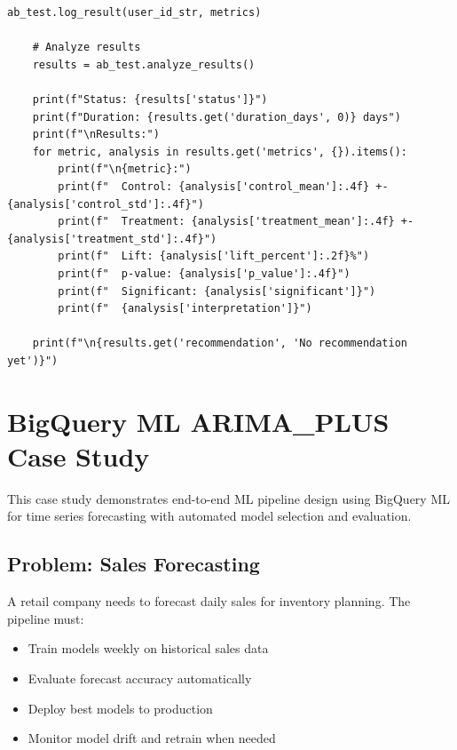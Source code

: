 \begin{lstlisting}[style=python, caption=Production A/B testing framework for ML models]
        ab_test.log_result(user_id_str, metrics)

    # Analyze results
    results = ab_test.analyze_results()

    print(f"Status: {results['status']}")
    print(f"Duration: {results.get('duration_days', 0)} days")
    print(f"\nResults:")
    for metric, analysis in results.get('metrics', {}).items():
        print(f"\n{metric}:")
        print(f"  Control: {analysis['control_mean']:.4f} +- {analysis['control_std']:.4f}")
        print(f"  Treatment: {analysis['treatment_mean']:.4f} +- {analysis['treatment_std']:.4f}")
        print(f"  Lift: {analysis['lift_percent']:.2f}%")
        print(f"  p-value: {analysis['p_value']:.4f}")
        print(f"  Significant: {analysis['significant']}")
        print(f"  {analysis['interpretation']}")

    print(f"\n{results.get('recommendation', 'No recommendation yet')}")
\end{lstlisting}

\section{BigQuery ML ARIMA\_PLUS Case Study}

This case study demonstrates end-to-end ML pipeline design using BigQuery ML for time series forecasting with automated model selection and evaluation.

\subsection{Problem: Sales Forecasting}

A retail company needs to forecast daily sales for inventory planning. The pipeline must:
\begin{itemize}
    \item Train models weekly on historical sales data
    \item Evaluate forecast accuracy automatically
    \item Deploy best models to production
    \item Monitor model drift and retrain when needed
\end{itemize}

